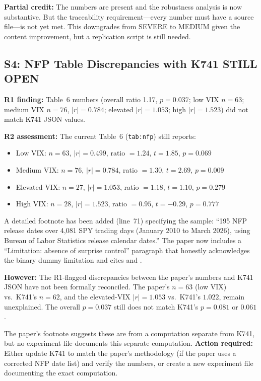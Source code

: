 \documentclass[12pt,a4paper]{article}
\begin{document}
\textbf{Partial credit:} The numbers are present and the robustness analysis is now substantive. But the traceability requirement---every number must have a source file---is not yet met. This downgrades from SEVERE to MEDIUM given the content improvement, but a replication script is still needed.


\subsection*{S4: NFP Table Discrepancies with K741 \hfill \textcolor{errorred}{STILL OPEN}}

\textbf{R1 finding:} Table~6 numbers (overall ratio 1.17, $p = 0.037$; low VIX $n = 63$; medium VIX $n = 76$, $|r| = 0.784$; elevated $|r| = 1.053$; high $|r| = 1.523$) did not match K741 JSON values.

\textbf{R2 assessment:} The current Table~6 (\texttt{tab:nfp}) still reports:
\begin{itemize}[nosep]
\item Low VIX: $n = 63$, $|r| = 0.499$, ratio $= 1.24$, $t = 1.85$, $p = 0.069$
\item Medium VIX: $n = 76$, $|r| = 0.784$, ratio $= 1.30$, $t = 2.69$, $p = 0.009$
\item Elevated VIX: $n = 27$, $|r| = 1.053$, ratio $= 1.18$, $t = 1.10$, $p = 0.279$
\item High VIX: $n = 28$, $|r| = 1.523$, ratio $= 0.95$, $t = -0.29$, $p = 0.777$
\end{itemize}

A detailed footnote has been added (line~71) specifying the sample: ``195 NFP release dates over 4,081 SPY trading days (January 2010 to March 2026), using Bureau of Labor Statistics release calendar dates.'' The paper now includes a ``Limitation: absence of surprise control'' paragraph that honestly acknowledges the binary dummy limitation and cites \citet{andersen2003} and \citet{balduzzi2001}.

\textbf{However:} The R1-flagged discrepancies between the paper's numbers and K741 JSON have not been formally reconciled. The paper's $n = 63$ (low VIX) vs.\ K741's $n = 62$, and the elevated-VIX $|r| = 1.053$ vs.\ K741's $1.022$, remain unexplained. The overall $p = 0.037$ still does not match K741's $p = 0.081$ or $0.061$.

The paper's footnote suggests these are from a computation separate from K741, but no experiment file documents this separate computation. \textbf{Action required:} Either update K741 to match the paper's methodology (if the paper uses a corrected NFP date list) and verify the numbers, or create a new experiment file documenting the exact computation.
\end{document}
